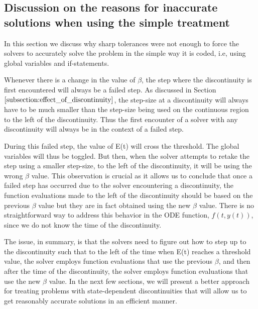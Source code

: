 \subsection{Discussion on the reasons for inaccurate solutions when using the simple treatment}
\label{subsection:state_sharp_tol_failed}
In this section we discuss why sharp tolerances were not enough to force the solvers to accurately solve the problem in the simple way it is coded, i.e, using global variables and if-statements. 

Whenever there is a change in the value of $\beta$, the step where the discontinuity is first encountered will always be a failed step. As discussed in Section $\ref{subsection:effect_of_discontinuity}$, the step-size at a discontinuity will always have to be much smaller than the step-size being used on the continuous region to the left of the discontinuity. Thus the first encounter of a solver with any discontinuity will always be in the context of a failed step.

During this failed step, the value of E(t) will cross the threshold. The global variables will thus be toggled. But then, when the solver attempts to retake the step using a smaller step-size, to the left of the discontinuity, it will be using the wrong $\beta$ value. This observation is crucial as it allows us to conclude that once a failed step has occurred due to the solver encountering a discontinuity, the function evaluations made to the left of the discontinuity should be based on the previous $\beta$ value but they are in fact obtained using the new $\beta$ value. There is no straightforward way to address this behavior in the ODE function, $f(t, y(t))$, since we do not know the time of the discontinuity. 

The issue, in summary, is that the solvers need to figure out how to step up to the discontinuity such that to the left of the time when E(t) reaches a threshold value, the solver employs function evaluations that use the previous $\beta$, and then after the time of the discontinuity, the solver employs function evaluations that use the new $\beta$ value. In the next few sections, we will present a better approach for treating problems with state-dependent discontinuities that will allow us to get reasonably accurate solutions in an efficient manner.

